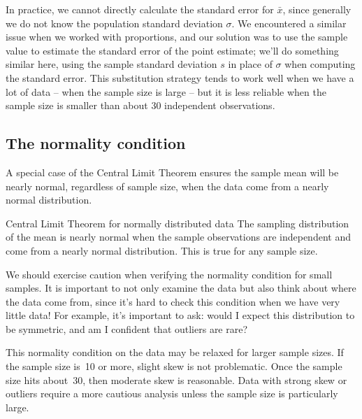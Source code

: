 In practice, we cannot directly calculate the standard error
for $\bar{x}$, since generally we do not know the population
standard deviation $\sigma$.
We encountered a similar issue when we worked with proportions,
and our solution was to use the sample value to estimate the
standard error of the point estimate;
we'll do something similar here, using the sample
standard deviation $s$ in place of $\sigma$ when computing
the standard error.
This substitution strategy tends to work well when we have
a lot of data -- when the sample size is large --
but it is less reliable when the sample size is smaller
than about 30 independent observations.



\subsection{The normality condition}
\label{normalityCond}


A special case of the Central Limit Theorem ensures
the sample mean will be nearly normal,
regardless of sample size, when the data come from
a nearly normal distribution.

\begin{onebox}{Central Limit Theorem for normally distributed data}
  The sampling distribution of the mean is nearly normal when
  the sample observations are independent and come from a nearly
  normal distribution.
  This is true for any sample size.
\end{onebox}

We should exercise caution when verifying the normality condition
for small samples.
It is important to not only examine the data but also think about
where the data come from, since it's hard to check this condition
when we have very little data!
For example, it's important to ask:
would I expect this distribution to be symmetric, and am I confident that outliers are rare?


This normality condition on the data may be relaxed for
larger sample sizes.
If the sample size is~10 or more, slight skew is not problematic.
Once the sample size hits about~30, then moderate skew is
reasonable.
Data with strong skew or outliers require a more cautious analysis
unless the sample size is particularly large.


